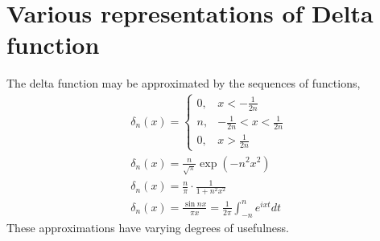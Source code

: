  \section{Various representations of Delta function}
 The delta function may be approximated by the sequences of functions, 
 $$
 \begin{array}{l}
 \delta_{n}(x)=\left\{\begin{array}{ll}
 0, & x<-\frac{1}{2 n} \\
 n, & -\frac{1}{2 n}<x<\frac{1}{2 n} \\
 0, & x>\frac{1}{2 n}
 \end{array}\right. \\
 \delta_{n}(x)=\frac{n}{\sqrt{\pi}} \exp \left(-n^{2} x^{2}\right) \\
 \delta_{n}(x)=\frac{n}{\pi} \cdot \frac{1}{1+n^{2} x^{2}} \\
 \delta_{n}(x)=\frac{\sin n x}{\pi x}=\frac{1}{2 \pi} \int_{-n}^{n} e^{i x t} d t
 \end{array}
 $$
 These approximations have varying degrees of usefulness.
